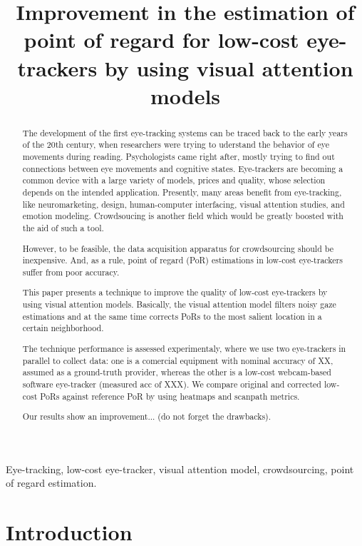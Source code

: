 \documentclass{article}
\title{Improvement in the estimation of point of regard for low-cost eye-trackers by using visual attention models}
\begin{document}
%
\maketitle
%
\begin{abstract}
	The development of the first eye-tracking systems can be traced back to the early years of the 20th century, when researchers were trying to uderstand the behavior of eye movements during reading. Psychologists came right after, mostly trying to find out connections between eye movements and cognitive states. Eye-trackers are becoming a common device with a large variety of models, prices and quality, whose selection depends on the intended application. Presently, many areas benefit from eye-tracking, like neuromarketing, design, human-computer interfacing, visual attention studies, and emotion modeling. Crowdsoucing is another field which would be greatly boosted with the aid of such a tool.

	 However, to be feasible, the data acquisition apparatus for crowdsourcing should be inexpensive. And, as a rule, point of regard (PoR) estimations in low-cost eye-trackers suffer from poor accuracy. %
	
	This paper presents a technique to improve the quality of low-cost eye-trackers by using visual attention models. Basically, the visual attention model filters noisy gaze estimations and at the same time corrects PoRs to the most salient location in a certain neighborhood.
	
	The technique performance is assessed experimentaly, where we use two eye-trackers in parallel to collect data: one is a comercial equipment with nominal accuracy of XX, assumed as a ground-truth provider, whereas the other is a low-cost webcam-based software eye-tracker (measured acc of XXX). We compare original and corrected low-cost PoRs against reference PoR by using heatmaps and scanpath metrics.

	Our results show an improvement... (do not forget the drawbacks).


\end{abstract}
%
\begin{keywords}
	Eye-tracking, low-cost eye-tracker, visual attention model, crowdsourcing, point of regard estimation.
\end{keywords}
%
\section{Introduction}
\label{sec:intro}
\end{document}

